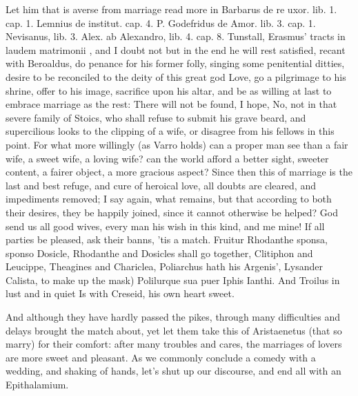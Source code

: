 {Let him that is averse from marriage read more in Barbarus de re uxor.
lib. 1. cap. 1. Lemnius de institut. cap. 4. P. Godefridus de Amor.
lib. 3. cap. 1. Nevisanus, lib. 3. Alex. ab Alexandro, lib. 4.
cap. 8. Tunstall, Erasmus' tracts in laudem matrimonii \etc{}, and I doubt
not but in the end he will rest satisfied, recant with Beroaldus, do
penance for his former folly, singing some penitential ditties, desire
to be reconciled to the deity of this great god Love, go a pilgrimage
to his shrine, offer to his image, sacrifice upon his altar, and be as
willing at last to embrace marriage as the rest: There will not be
found, I hope, No, not in that severe family of Stoics, who shall
refuse to submit his grave beard, and supercilious looks to the
clipping of a wife, or disagree from his fellows in this point. For
what more willingly (as Varro holds) can a proper man see than a
fair wife, a sweet wife, a loving wife? can the world afford a better
sight, sweeter content, a fairer object, a more gracious aspect?
Since then this of marriage is the last and best refuge, and cure of
heroical love, all doubts are cleared, and impediments removed; I say
again, what remains, but that according to both their desires, they be
happily joined, since it cannot otherwise be helped? God send us all
good wives, every man his wish in this kind, and me mine!
%
%
If all parties be pleased, ask their banns, 'tis a match. Fruitur
Rhodanthe sponsa, sponso Dosicle, Rhodanthe and Dosicles shall go
together, Clitiphon and Leucippe, Theagines and Chariclea, Poliarchus
hath his Argenis', Lysander Calista, to make up the mask)
Polilurque sua puer Iphis Ianthi.
And Troilus in lust and in quiet
Is with Creseid, his own heart sweet.

And although they have hardly passed the pikes, through many
difficulties and delays brought the match about, yet let them take this
of  Aristaenetus (that so marry) for their comfort: after
many troubles and cares, the marriages of lovers are more sweet and
pleasant. As we commonly conclude a comedy with a wedding, and
shaking of hands, let's shut up our discourse, and end all with an
Epithalamium.

}
